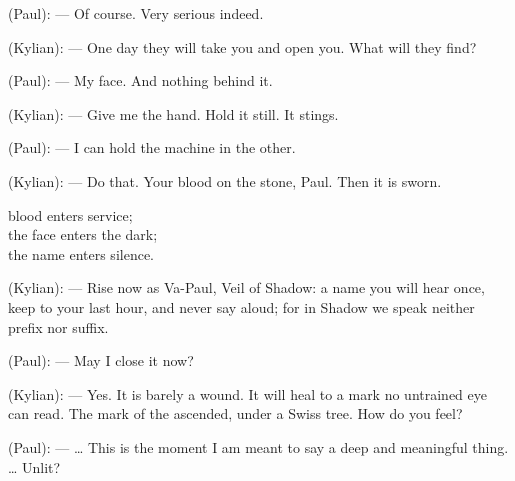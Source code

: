 \begin{room}
(Paul): --- Of course. Very serious indeed.

(Kylian): --- One day they will take you and open you. What will they find?

(Paul): --- My face. And nothing behind it.

(Kylian): --- Give me the hand. Hold it still. It stings.

(Paul): --- I can hold the machine in the other.

(Kylian): --- Do that. Your blood on the stone, Paul. Then it is sworn.

\begin{scripture}
blood enters service; \\
the face enters the dark; \\
the name enters silence.
\end{scripture}

(Kylian): --- Rise now as Va-Paul, Veil of Shadow: a name you will hear once, keep to your last hour, and never say aloud; for in Shadow we speak neither prefix nor suffix.

\centerline{}

(Paul): --- May I close it now?

(Kylian): --- Yes. It is barely a wound. It will heal to a mark no untrained eye can read. The mark of the ascended, under a Swiss tree. How do you feel?

(Paul): --- \ldots{} This is the moment I am meant to say a deep and meaningful thing. \ldots{} Unlit?

\end{room}
